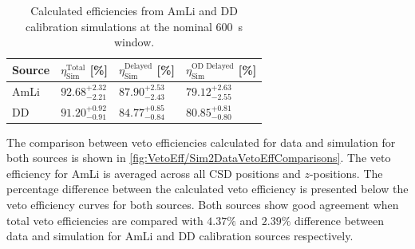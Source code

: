 \renewcommand{\arraystretch}{1.5}
\begin{table}[h!]
    \centering
    \caption[Calculated efficiencies from AmLi and DD calibration simulations at the nominal 600~\textmu s window.]{Calculated efficiencies from AmLi and DD calibration simulations at the nominal 600~\textmu s window.}
    \begin{tabular}{llll}
    \hline\hline
    \textbf{Source} & \textbf{$\eta^\text{Total}_\text{Sim}$ [\%]} & \textbf{$\eta^\text{Delayed}_\text{Sim}$ [\%]} & \textbf{$\eta^\text{OD Delayed}_\text{Sim}$ [\%]}\\
    \hline
    AmLi & $92.68^{+2.32}_{-2.21}$ & $87.90^{+2.53}_{-2.43}$ & $79.12^{+2.63}_{-2.55}$ \\
    DD & $91.20^{+0.92}_{-0.91}$ & $84.77^{+0.85}_{-0.84}$ & $80.85^{+0.81}_{-0.80}$\\
    \hline\hline
    \end{tabular}
    \label{tab:VetoEff/CalibrationSimulationEfficiencies}
\end{table}
\renewcommand{\arraystretch}{1}

The comparison between veto efficiencies calculated for data and simulation for both sources is shown in \autoref{fig:VetoEff/Sim2DataVetoEffComparisons}. The veto efficiency for AmLi is averaged across all CSD positions and $z$-positions. The percentage difference between the calculated veto efficiency is presented below the veto efficiency curves for both sources. Both sources show good agreement when total veto efficiencies are compared with $4.37\%$ and $2.39\%$ difference between data and simulation for AmLi and DD calibration sources respectively.


